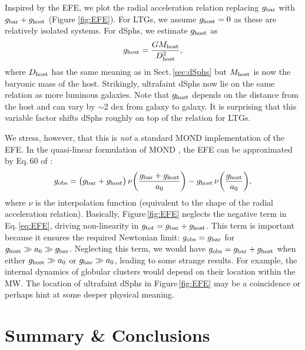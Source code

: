 \documentclass[apjl, twocolappendix]{emulateapj}
\begin{document}
Inspired by the EFE, we plot the radial acceleration relation replacing $g_{\rm bar}$ with $g_{\rm bar}+g_{\rm host}$ (Figure \ref{fig:EFE}). For LTGs, we assume $g_{\rm host} = 0$ as these are relatively isolated systems. For dSphs, we estimate $g_{\rm host}$ as
\begin{equation}
g_{\rm host} = \dfrac{G M_{\rm host}}{D_{\rm host}^2},
\end{equation}
where $D_{\rm host}$ has the same meaning as in Sect.\,\ref{sec:dSphs} but $M_{\rm host}$ is now the baryonic mass of the host. Strikingly, ultrafaint dSphs now lie on the same relation as more luminous galaxies. Note that $g_{\rm host}$ depends on the distance from the host and can vary by $\sim$2 dex from galaxy to galaxy. It is surprising that this variable factor shifts dSphs roughly on top of the relation for LTGs. 

We stress, however, that this is \textit{not} a standard MOND implementation of the EFE. In the quasi-linear formulation of MOND \citep{Milgrom2010}, the EFE can be approximated by Eq.\,60 of \citet{Famaey2012}:
\begin{equation}\label{eq:EFE}
 g_{\rm obs} = \big(g_{\rm bar} + g_{\rm host}\big) \, \nu\bigg(\dfrac{g_{\rm bar} + g_{\rm host}}{a_0}\bigg) - g_{\rm host} \,\nu\bigg(\dfrac{g_{\rm host}}{a_0}\bigg),
\end{equation}
where $\nu$ is the interpolation function (equivalent to the shape of the radial acceleration relation). Basically, Figure\,\ref{fig:EFE} neglects the negative term in Eq.\,\ref{eq:EFE}, driving non-linearity in $g_{\rm tot} = g_{\rm bar} + g_{\rm host}$. This term is important because it ensures the required Newtonian limit: $g_{\rm obs} = g_{\rm bar}$ for $g_{\rm host} \gg a_0 \gg g_{\rm bar}$. Neglecting this term, we would have $g_{\rm obs} = g_{\rm bar} + g_{\rm host}$ when either $g_{\rm host} \gg a_0$ or $g_{\rm bar} \gg a_0$, leading to some strange results. For example, the internal dynamics of globular clusters would depend on their location within the MW. The location of ultrafaint dSphs in Figure\,\ref{fig:EFE} may be a coincidence or perhaps hint at some deeper physical meaning.

\section{Summary \& Conclusions}\label{sec:Conc}
\end{document}
